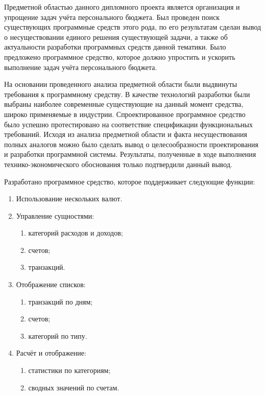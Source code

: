 
Предметной областью данного дипломного проекта является организация и упрощение задач учёта персонального бюджета.
Был проведен поиск существующих программные средств этого рода, по его результатам сделан вывод о несуществовании единого решения существующей задачи, а также об актуальности разработки программных средств данной тематики.
Было предложено программное средство, которое должно упростить и ускорить выполнение задач учёта персонального бюджета.

На основании проведенного анализа предметной области были выдвинуты требования к программному средству.
В качестве технологий разработки были выбраны наиболее современные существующие на данный момент средства, широко применяемые в индустрии.
Спроектированное программное средство было успешно протестировано на соответствие спецификации функциональных требований.
Исходя из анализа предметной области и факта несуществования полных аналогов можно было сделать вывод о целесообразности проектирования и разработки программной системы.
Результаты, полученные в ходе выполнения технико-экономического обоснования только подтвердили данный вывод.

Разработано программное средство, которое поддерживает следующие функции:
\begin{enumerate}
    \item Использование нескольких валют.
    \item Управление сущностями:
    \begin{enumerate}
        \item категорий расходов и доходов;
        \item счетов;
        \item транзакций.
    \end{enumerate}
    \item Отображение списков:
    \begin{enumerate}
        \item транзакций по дням;
        \item счетов;
        \item категорий по типу.
    \end{enumerate}
    \item Расчёт и отображение:
    \begin{enumerate}
        \item статистики по категориям;
        \item сводных значений по счетам.
    \end{enumerate}
\end{enumerate}

